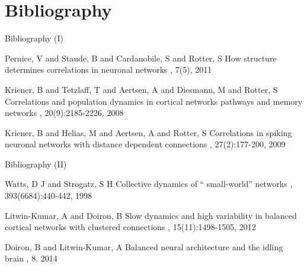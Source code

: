 \documentclass[fleqn]{beamer}
\newcommand{\curldoquom}[1]{\textquotedblleft
#1\textquotedblright\hspace{.01mm}}
\begin{document}
\section{Bibliography}
\setcounter{page}{18}
\begin{frame}{Bibliography (I)}
\begin{thebibliography}{9}

Pernice, V and Staude, B and Cardanobile, S and Rotter, S
\newblock How structure determines correlations in neuronal networks
, 7(5), 2011

Kriener, B and Tetzlaff, T and Aertsen, A and Diesmann, M and  Rotter, S
\newblock Correlations and population dynamics in cortical networks
pathways and memory networks
, 20(9):2185-2226, 2008

Kriener, B and Helias, M and Aertsen, A and Rotter, S
\newblock Correlations in spiking neuronal networks with distance dependent
connections
, 27(2):177-200, 2009

\end{thebibliography}
\end{frame}
\setcounter{page}{18}
\begin{frame}{Bibliography (II)}
\begin{thebibliography}{9}

Watts, D J and Strogatz, S H
\newblock Collective dynamics of \curldoquom{small-world} networks
, 393(6684):440-442, 1998

Litwin-Kumar, A and Doiron, B
\newblock Slow dynamics and high variability in balanced cortical networks with
clustered connections
, 15(11):1498-1505, 2012


Doiron, B and Litwin-Kumar, A 
\newblock Balanced neural architecture and the idling brain
, 8. 2014



\end{thebibliography}
\end{frame}
\end{document}
